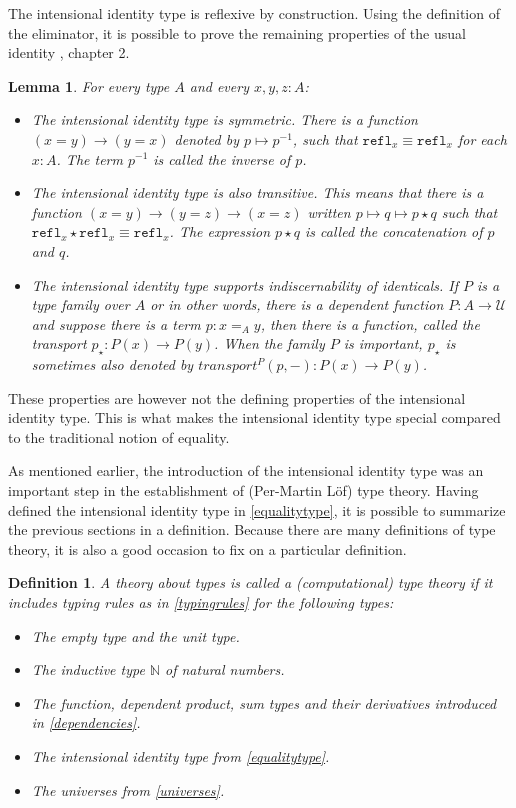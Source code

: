\documentclass[12pt,a4paper,twoside,xetex]{book}
\newcommand{\keyword}[1]{\emph{#1}\index{#1}}
\newtheorem{lemma}[theorem]{Lemma}
\newtheorem{definition}[theorem]{Definition}
\newcommand{\op}[1]{\mathtt{#1}}
\begin{document}
The intensional identity type is reflexive by construction. Using the definition of the eliminator, it is possible to prove the remaining properties of the usual identity \cite{Voevodsky2013}, chapter 2. 

\begin{lemma}
  For every type $A$ and every $x,y,z:A$:
  \begin{itemize}
  \item The intensional identity type is symmetric. There is a function $(x=y)\rightarrow (y=x)$ denoted by $p \mapsto p^{-1}$, such that $\op{refl}_x\equiv \op{refl}_x$ for each $x: A$. The term $p^{-1}$ is called the inverse of $p$.
  \item The intensional identity type is also transitive. This means that there is a function $(x=y)\rightarrow (y=z) \rightarrow (x=z)$ written $p \mapsto q \mapsto p \star q$ such that $\op{refl}_x \star \op{refl}_x \equiv \op{refl}_x$. The expression $ p \star q$ is called the \keyword{concatenation} of $p$ and $q$.
    \item The intensional identity type supports indiscernability of identicals. If $P$ is a type family over $A$ or in other words, there is a dependent function $P:A \rightarrow \mathcal{U}$ and suppose there is a term $p: x=_Ay$, then there is a function, called the transport $p_\star:P(x)\rightarrow P(y)$. When the family $P$ is important, $p_\star$ is sometimes also denoted by $transport^P(p,-):P(x) \rightarrow P(y)$.
    \end{itemize}
\end{lemma}

These properties are however not the defining properties of the intensional identity type. This is what makes the intensional identity type special compared to the traditional notion of equality.


As mentioned earlier, the introduction of the intensional identity type was an important step in the establishment of (Per-Martin L\"of) type theory. Having defined the intensional identity type in \cref{equalitytype}, it is possible to summarize the previous sections in a definition. Because there are many definitions of type theory, it is also a good occasion to fix on a particular definition.

\begin{definition}\label{typetheory}
  A theory about types is called a (computational) \keyword{type theory} if it includes typing rules as in \cref{typingrules} for the following types:
  \begin{itemize}
   \item The empty type and the unit type.
   \item The inductive type $\mathbb{N}$ of natural numbers.
   \item The function, dependent product, sum types and their derivatives introduced in \cref{dependencies}.
   \item The intensional identity type from \cref{equalitytype}.
   \item The universes from \cref{universes}.
  \end{itemize}
\end{definition}
\end{document}
